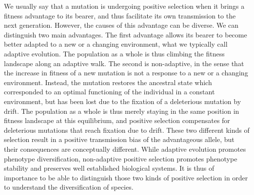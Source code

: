 \documentclass{article}
\begin{document}
    We usually say that a mutation is undergoing positive selection when it brings a fitness advantage to its bearer, and thus facilitate its own transmission to the next generation.
    However, the causes of this advantage can be diverse.
    We can distinguish two main advantages.
    The first advantage allows its bearer to become better adapted to a new or a changing environment, what we typically call adaptive evolution.
    The population as a whole is thus climbing the fitness landscape along an adaptive walk\cite{tenaillon_utility_2014}.
    The second is non-adaptive, in the sense that the increase in fitness of a new mutation is not a response to a new or a changing environment.
    Instead, the mutation restores the ancestral state which corresponded to an optimal functioning of the individual in a constant environment, but has been lost due to the fixation of a deleterious mutation by drift.
    The population as a whole is thus merely staying in the same position in fitness landscape at this equilibrium, and positive selection compensates for deleterious mutations that reach fixation due to drift\cite{sella_application_2005, mustonen_fitness_2009}.
    These two different kinds of selection result in a positive transmission bias of the advantageous allele, but their consequences are conceptually different.
    While adaptive evolution promotes phenotype diversification, non-adaptive positive selection promotes phenotype stability and preserves well established biological systems.
    It is thus of importance to be able to distinguish those two kinds of positive selection in order to understand the diversification of species.
\end{document}
